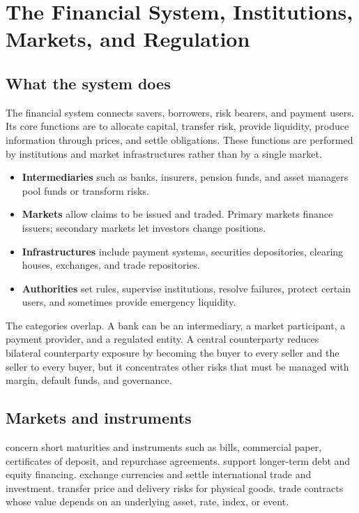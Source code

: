 \chapter{The Financial System, Institutions, Markets, and Regulation}

\section{What the system does}
The financial system connects savers, borrowers, risk bearers, and payment users. Its core functions are to allocate capital, transfer risk, provide liquidity, produce information through prices, and settle obligations. These functions are performed by institutions and market infrastructures rather than by a single market.

\begin{itemize}
  \item \textbf{Intermediaries} such as banks, insurers, pension funds, and asset managers pool funds or transform risks.
  \item \textbf{Markets} allow claims to be issued and traded. Primary markets finance issuers; secondary markets let investors change positions.
  \item \textbf{Infrastructures} include payment systems, securities depositories, clearing houses, exchanges, and trade repositories.
  \item \textbf{Authorities} set rules, supervise institutions, resolve failures, protect certain users, and sometimes provide emergency liquidity.
\end{itemize}

The categories overlap. A bank can be an intermediary, a market participant, a payment provider, and a regulated entity. A central counterparty reduces bilateral counterparty exposure by becoming the buyer to every seller and the seller to every buyer, but it concentrates other risks that must be managed with margin, default funds, and governance.

\section{Markets and instruments}
 concern short maturities and instruments such as bills, commercial paper, certificates of deposit, and repurchase agreements.  support longer-term debt and equity financing.  exchange currencies and settle international trade and investment.  transfer price and delivery risks for physical goods.  trade contracts whose value depends on an underlying asset, rate, index, or event.

